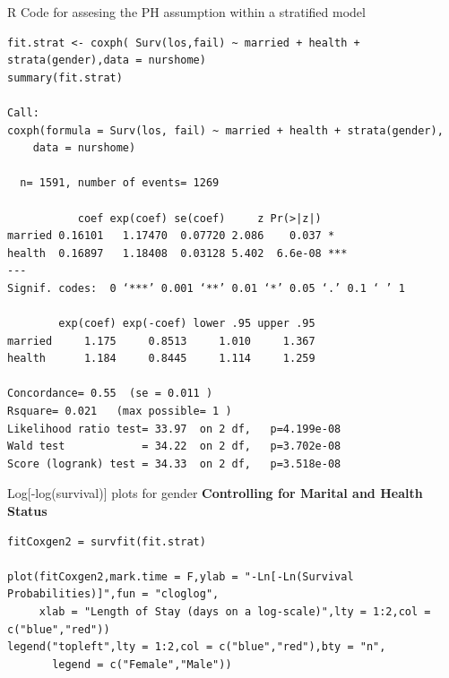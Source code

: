 \documentclass[envcountsect, 10pt, portrait, palatino]{beamer}
\begin{document}
\begin{frame}[fragile]{R Code for assesing the PH assumption within a stratified model}

\scriptsize
\begin{verbatim}
fit.strat <- coxph( Surv(los,fail) ~ married + health + strata(gender),data = nurshome)
summary(fit.strat)

Call:
coxph(formula = Surv(los, fail) ~ married + health + strata(gender),
    data = nurshome)

  n= 1591, number of events= 1269

           coef exp(coef) se(coef)     z Pr(>|z|)
married 0.16101   1.17470  0.07720 2.086    0.037 *
health  0.16897   1.18408  0.03128 5.402  6.6e-08 ***
---
Signif. codes:  0 ‘***’ 0.001 ‘**’ 0.01 ‘*’ 0.05 ‘.’ 0.1 ‘ ’ 1

        exp(coef) exp(-coef) lower .95 upper .95
married     1.175     0.8513     1.010     1.367
health      1.184     0.8445     1.114     1.259

Concordance= 0.55  (se = 0.011 )
Rsquare= 0.021   (max possible= 1 )
Likelihood ratio test= 33.97  on 2 df,   p=4.199e-08
Wald test            = 34.22  on 2 df,   p=3.702e-08
Score (logrank) test = 34.33  on 2 df,   p=3.518e-08
\end{verbatim}
\end{frame}
\begin{frame}[fragile]{Log[-log(survival)] plots for gender {\bf Controlling for Marital and Health Status}}

\scriptsize
\begin{verbatim}
fitCoxgen2 = survfit(fit.strat)

plot(fitCoxgen2,mark.time = F,ylab = "-Ln[-Ln(Survival Probabilities)]",fun = "cloglog",
     xlab = "Length of Stay (days on a log-scale)",lty = 1:2,col = c("blue","red"))
legend("topleft",lty = 1:2,col = c("blue","red"),bty = "n",
       legend = c("Female","Male"))
\end{verbatim}
\end{frame}
\end{document}
